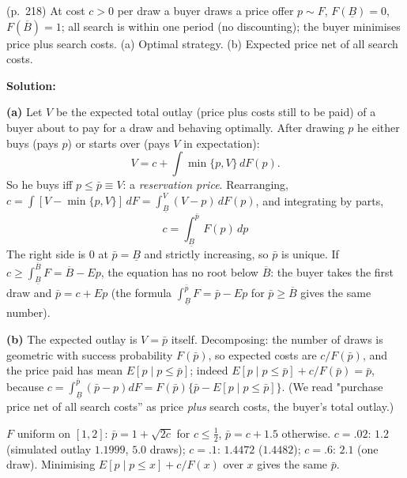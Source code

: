 \documentclass[12pt, letterpaper]{article}
\begin{document}
\begin{tcolorbox}[oddbox,title={Exercise 6.21 \quad Searching for the Lowest Price}]
\begin{tcolorbox}[questionbox]
(p.~218) At cost $c>0$ per draw a buyer draws a price offer $p\sim F$, $F(\underline B)=0$,
$F(\overline B)=1$; all search is within one period (no discounting); the buyer minimises price plus
search costs. (a) Optimal strategy. (b) Expected price net of all search costs.
\end{tcolorbox}

\textbf{Solution:}

\textbf{(a)} Let $V$ be the expected total outlay (price plus costs still to be paid) of a buyer about to pay
for a draw and behaving optimally. After drawing $p$ he either buys (pays $p$) or starts over (pays $V$
in expectation):
\[
V=c+\int\min\{p,V\}\,dF(p).
\]
So he buys iff $p\le\bar p\equiv V$: a \emph{reservation price}. Rearranging,
$c=\int[V-\min\{p,V\}]\,dF=\int_{\underline B}^{V}(V-p)\,dF(p)$, and integrating by parts,
\[
\boxed{c=\int_{\underline B}^{\bar p}F(p)\,dp}
\]
The right side is $0$ at $\bar p=\underline B$ and strictly increasing, so $\bar p$ is unique. If
$c\ge\int_{\underline B}^{\overline B}F=\overline B-Ep$, the equation has no root below $\overline B$: the buyer
takes the first draw and $\bar p=c+Ep$ (the formula $\int_{\underline B}^{\bar p}F=\bar p-Ep$ for $\bar p\ge\overline B$
gives the same number).

\textbf{(b)} The expected outlay is $V=\bar p$ itself. Decomposing: the number of draws is geometric with
success probability $F(\bar p)$, so expected costs are $c/F(\bar p)$, and the price paid has mean
$E[p\mid p\le\bar p]$; indeed $E[p\mid p\le\bar p]+c/F(\bar p)=\bar p$, because
$c=\int_{\underline B}^{\bar p}(\bar p-p)dF=F(\bar p)\{\bar p-E[p\mid p\le\bar p]\}$. (We read "purchase price net
of all search costs'' as price \emph{plus} search costs, the buyer's total outlay.)

\begin{tcolorbox}[databox]
$F$ uniform on $[1,2]$: $\bar p=1+\sqrt{2c}$ for $c\le\frac12$, $\bar p=c+1.5$ otherwise. $c=.02$: $1.2$ (simulated
outlay $1.1999$, $5.0$ draws); $c=.1$: $1.4472$ ($1.4482$); $c=.6$: $2.1$ (one draw). Minimising
$E[p\mid p\le x]+c/F(x)$ over $x$ gives the same $\bar p$.
\end{tcolorbox}
\end{tcolorbox}

\end{document}
